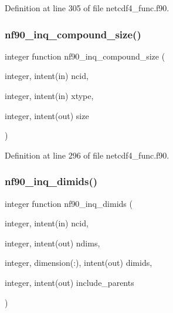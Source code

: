 Definition at line 305 of file netcdf4\+\_\+func.\+f90.

\mbox{\label{netcdf4__func_8f90_ac7d2aa6aae07ec2e3a1342ec9ef11df5}} 
\subsubsection{\texorpdfstring{nf90\+\_\+inq\+\_\+compound\+\_\+size()}{nf90\_inq\_compound\_size()}}
{\footnotesize\ttfamily integer function nf90\+\_\+inq\+\_\+compound\+\_\+size (\begin{DoxyParamCaption}\item[{integer, intent(in)}]{ncid,  }\item[{integer, intent(in)}]{xtype,  }\item[{integer, intent(out)}]{size }\end{DoxyParamCaption})}



Definition at line 296 of file netcdf4\+\_\+func.\+f90.

\mbox{\label{netcdf4__func_8f90_a7caba349a754de65fab0f407cfb8f762}} 
\subsubsection{\texorpdfstring{nf90\+\_\+inq\+\_\+dimids()}{nf90\_inq\_dimids()}}
{\footnotesize\ttfamily integer function nf90\+\_\+inq\+\_\+dimids (\begin{DoxyParamCaption}\item[{integer, intent(in)}]{ncid,  }\item[{integer, intent(out)}]{ndims,  }\item[{integer, dimension(\+:), intent(out)}]{dimids,  }\item[{integer, intent(out)}]{include\+\_\+parents }\end{DoxyParamCaption})}



